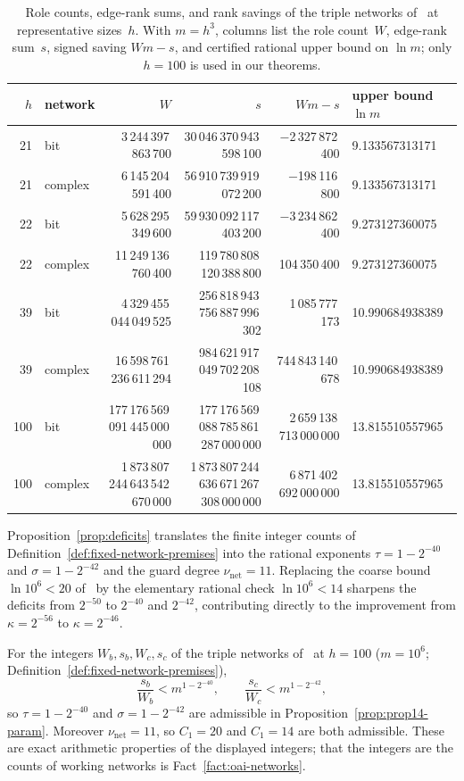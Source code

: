 \begin{table}[htbp]
\centering\scriptsize
\caption{Role counts, edge-rank sums, and rank savings of the triple networks of~\cite[\S3]{OAI26} at representative sizes~$h$. With $m=h^3$, columns list the role count~$W$, edge-rank sum~$s$, signed saving $Wm-s$, and certified rational upper bound on $\ln m$; only $h=100$ is used in our theorems.}\label{app:cert-closed}\label{app:cert-ln}
\setlength{\tabcolsep}{3.5pt}
\begin{tabular}{@{}rlrrrl@{}}
\toprule
$h$ & network & $W$ & $s$ & $Wm-s$ & upper bound $\ln m$\\
\midrule
21 & bit & 3\,244\,397\,863\,700 & 30\,046\,370\,943\,598\,100 & $-$2\,327\,872\,400 & 9.133567313171\\
21 & complex & 6\,145\,204\,591\,400 & 56\,910\,739\,919\,072\,200 & $-$198\,116\,800 & 9.133567313171\\
22 & bit & 5\,628\,295\,349\,600 & 59\,930\,092\,117\,403\,200 & $-$3\,234\,862\,400 & 9.273127360075\\
22 & complex & 11\,249\,136\,760\,400 & 119\,780\,808\,120\,388\,800 & 104\,350\,400 & 9.273127360075\\
39 & bit & 4\,329\,455\,044\,049\,525 & 256\,818\,943\,756\,887\,996\,302 & 1\,085\,777\,173 & 10.990684938389\\
39 & complex & 16\,598\,761\,236\,611\,294 & 984\,621\,917\,049\,702\,208\,108 & 744\,843\,140\,678 & 10.990684938389\\
100 & bit & 177\,176\,569\,091\,445\,000\,000 & 177\,176\,569\,088\,785\,861\,287\,000\,000 & 2\,659\,138\,713\,000\,000 & 13.815510557965\\
100 & complex & 1\,873\,807\,244\,643\,542\,670\,000 & 1\,873\,807\,244\,636\,671\,267\,308\,000\,000 & 6\,871\,402\,692\,000\,000 & 13.815510557965\\
\bottomrule
\end{tabular}
\end{table}

Proposition~\ref{prop:deficits} translates the finite integer counts of Definition~\ref{def:fixed-network-premises} into the rational exponents $\tau=1-2^{-40}$ and $\sigma=1-2^{-42}$ and the guard degree $\nu_{\mathrm{net}}=11$. Replacing the coarse bound $\ln 10^6<20$ of~\cite[\S3.6]{OAI26} by the elementary rational check $\ln 10^6<14$ sharpens the deficits from $2^{-50}$ to $2^{-40}$ and $2^{-42}$, contributing directly to the improvement from $\kappa=2^{-56}$ to $\kappa=2^{-46}$.

\begin{proposition}[Network exponents at $h=100$]\label{prop:deficits}
For the integers $W_b,s_b,W_c,s_c$ of the triple networks of~\cite[\S3]{OAI26} at $h=100$ ($m=10^6$;
Definition~\ref{def:fixed-network-premises}),
\[
  \frac{s_b}{W_b}<m^{1-2^{-40}},\qquad \frac{s_c}{W_c}<m^{1-2^{-42}},
\]
so $\tau=1-2^{-40}$ and $\sigma=1-2^{-42}$ are admissible in Proposition~\ref{prop:prop14-param}. Moreover
$\nu_{\mathrm{net}}=11$, so $C_1=20$ and $C_1=14$ are both admissible. These are exact arithmetic properties of the
displayed integers; that the integers are the counts of working networks is Fact~\ref{fact:oai-networks}.
\end{proposition}

